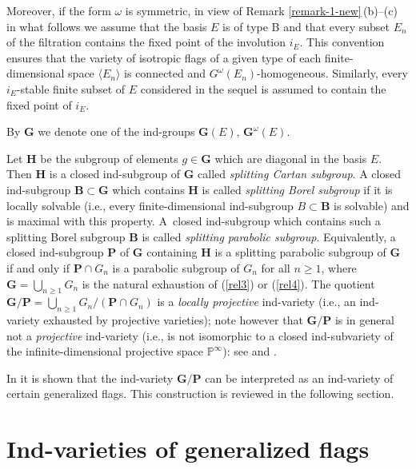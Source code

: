 \documentclass[12pt]{amsart}
\theoremstyle{definition}
\begin{document}
Moreover, if the form $\omega$ is symmetric, in view of Remark \ref{remark-1-new}\,{\rm (b)}--{\rm (c)} in what follows we assume that the basis $E$ is of type B and that every subset $E_n$ of the filtration contains the fixed point of the involution $i_E$. This convention ensures that the variety of isotropic flags of a given type of each finite-dimensional space $\langle E_n\rangle$ is connected and $G^\omega(E_n)$-homogeneous. Similarly, every $i_E$-stable finite subset of $E$ considered in the sequel is assumed to contain the fixed point of $i_E$.

By $\mathbf{G}$ we denote one of the ind-groups $\mathbf{G}(E)$, $\mathbf{G}^\omega(E)$.

Let $\mathbf{H}$ be the subgroup of elements $g\in \mathbf{G}$ which are diagonal in the basis $E$. Then $\mathbf{H}$ is a closed ind-subgroup of $\mathbf{G}$ called {\em splitting Cartan subgroup}.
A closed ind-subgroup $\mathbf{B}\subset\mathbf{G}$ which contains $\mathbf{H}$
is called {\em splitting Borel subgroup} if it is locally solvable (i.e., every finite-dimensional ind-subgroup $B\subset\mathbf{B}$ is solvable) and is maximal with this property. A\ closed ind-subgroup which contains such a  splitting Borel subgroup $\mathbf{B}$ is called {\em  splitting parabolic subgroup}.
Equivalently,
a closed ind-subgroup $\mathbf{P}$ of $\mathbf{G}$ containing $\mathbf{H}$ is a  splitting parabolic subgroup of $\mathbf{G}$ if and only if $\mathbf{P}\cap G_n$ is a parabolic subgroup of $G_n$ for all $n\geq 1$, where $\mathbf{G}=\bigcup_{n\geq 1}G_n$ is the natural exhaustion
of (\ref{rel3}) or (\ref{rel4}). The quotient $\mathbf{G}/\mathbf{P}=\bigcup_{n\geq 1}G_n/(\mathbf{P}\cap G_n)$ is a {\em locally projective} ind-variety (i.e., an ind-variety exhausted by projective varieties); note however that $\mathbf{G}/\mathbf{P}$ is in general not a {\em projective} ind-variety (i.e., is not isomorphic to a closed ind-subvariety of the infinite-dimensional projective space $\mathbb{P}^\infty$): see \cite[Proposition 7.2]{DP} and \cite[Proposition 15.1]{DPW}.

In \cite{DP} it is shown that the ind-variety $\mathbf{G}/\mathbf{P}$
can be interpreted as an ind-variety of certain generalized flags. This construction is reviewed in the following section.

\section{Ind-varieties of generalized flags}
\end{document}
